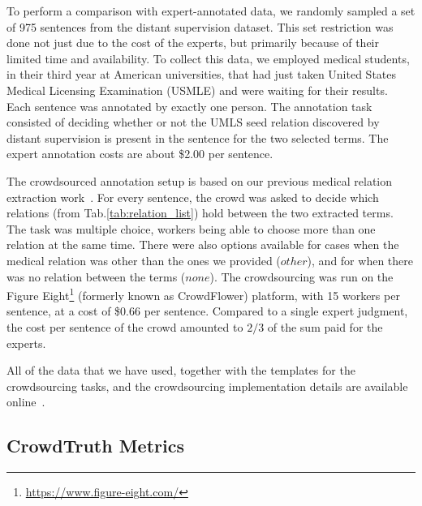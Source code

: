To perform a comparison with expert-annotated data, we randomly sampled a set of 975 sentences from the distant supervision dataset. This set restriction was done not just due to the cost of the experts, but primarily because of their limited time and availability. To collect this data, we employed medical students, in their third year at American universities, that had just taken  United States Medical Licensing Examination (USMLE) and were waiting for their results.  Each sentence was annotated by exactly one person. The annotation task consisted of deciding whether or not the UMLS seed relation discovered by distant supervision is present in the sentence for the two selected terms. The expert annotation costs are about \$2.00 per sentence.

The crowdsourced annotation setup is based on our previous medical relation extraction work~\cite{aroyo2014threesides}. For every sentence, the crowd was asked to decide which relations (from Tab.\ref{tab:relation_list}) hold between the two extracted terms. The task was multiple choice, workers being able to choose more than one relation at the same time.  There were also options available for cases when the medical relation was other than the ones we provided ($other$), and for when there was no relation between the terms ($none$). The crowdsourcing was run on the Figure Eight\footnote{\url{https://www.figure-eight.com/}} (formerly known as CrowdFlower) platform, with 15 workers per sentence, at a cost of \$0.66 per sentence. Compared to a single expert judgment, the cost per sentence of the crowd amounted to  $2/3$ of the sum paid for the experts.

All of the data that we have used, together with the templates for the crowdsourcing tasks, and the crowdsourcing implementation details are available online~\cite{anca_dumitrache_2016_50676}.


\subsection{CrowdTruth Metrics}

